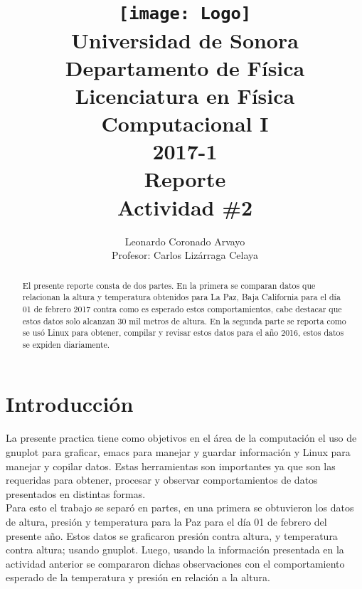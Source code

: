 \documentclass[12pt,letterpaper]{article}
\author{
Leonardo Coronado Arvayo\\
Profesor: Carlos Lizárraga Celaya   \vspace*{1.25in}}
\title{	\texttt{[image: Logo]} \\
Universidad de Sonora \\
{\small Departamento de Física \\
Licenciatura en Física \\
Computacional I \\
2017-1 \\
\vspace{0.55in} Reporte}\\ 
{\Huge Actividad \#2}\\
\vspace*{1.0in}}
\begin{document}
	\maketitle
\newpage
	\tableofcontents
\pagebreak

\begin{abstract}
El presente reporte consta de dos partes. En la primera se comparan datos que relacionan la altura y temperatura obtenidos para La Paz, Baja California para el día 01 de febrero 2017 contra como es esperado estos comportamientos, cabe destacar que estos datos solo alcanzan 30 mil metros de altura. En la segunda parte se reporta como se usó Linux para obtener, compilar y revisar estos datos para el año 2016, estos datos se expiden diariamente. \\
\end{abstract}


\section{Introducción}

La presente practica tiene como objetivos en el área de la computación el uso de gnuplot para graficar, emacs para manejar y guardar información y Linux para manejar y copilar datos. Estas herramientas son importantes ya que son las requeridas para obtener, procesar y observar comportamientos de datos presentados en distintas formas. \\

Para esto el trabajo se separó en partes, en una primera se obtuvieron los datos de altura, presión y temperatura para la Paz para el día 01 de febrero del presente año\cite{a}. Estos datos se graficaron presión contra altura, y temperatura contra altura; usando gnuplot. Luego, usando la información presentada en la actividad anterior se compararon dichas observaciones con el comportamiento esperado de la temperatura y presión en relación a la altura. \\
\end{document}
